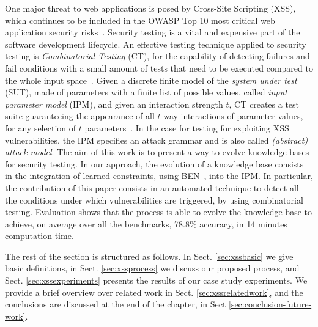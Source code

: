 \begin{tikzborder}{\cite{Gargantini16:validation}}
\begin{tikzborder}{\cite{gargantini_combinatorial_2017}}
\begin{tikzborder}{\cite{gargantini_combinatorial_2017}}
One major threat to web applications is posed by Cross-Site Scripting (XSS), which continues to be included in the OWASP Top 10 most critical web application security risks~\cite{owasp17}.
Security testing is a vital and expensive part of the software development lifecycle.
An effective testing technique applied to security testing is \emph{Combinatorial Testing} (CT), for the capability of detecting failures and fail conditions with a small amount of tests that need to be executed compared to the whole input space~\cite{SKVKS2016:IEEEComp}. Given a discrete finite model of the \textit{system under test}
(SUT), made of parameters with a finite list of possible values, called \textit{input parameter model} (IPM), and given an
interaction strength $t$, CT creates a test suite guaranteeing the appearance of all $t$-way interactions of parameter values, for any selection of $t$ parameters~\cite{kuhn2013introductionbook}. 
In the case for testing for exploiting XSS vulnerabilities, the IPM specifies an attack grammar and is also called \textit{(abstract) attack model}.
The aim of this work is to present a way to evolve knowledge bases for security testing. 
In our approach, the evolution of a knowledge base consists in the integration of learned constraints, using BEN~\cite{ghandehari2018combinatorial}, into the IPM. 
In particular, the contribution of this paper consists in an automated technique to detect all the conditions under which vulnerabilities are triggered, by using combinatorial testing.
Evaluation shows that the process is able to evolve the knowledge base to achieve, on average over all the benchmarks, 78.8\% accuracy, in 14 minutes computation time.

The rest of the section is structured as follows. In Sect. \ref{sec:xssbasic} we give basic definitions,
in Sect. \ref{sec:xssprocess} we discuss our proposed process, and Sect. \ref{sec:xssexperiments} presents the results of our case study experiments. We provide a brief overview over related work in Sect. \ref{sec:xssrelatedwork},
and the conclusions are discussed at the end of the chapter, in Sect \ref{sec:conclusion-future-work}.


\end{tikzborder}
\end{tikzborder}
\end{tikzborder}
